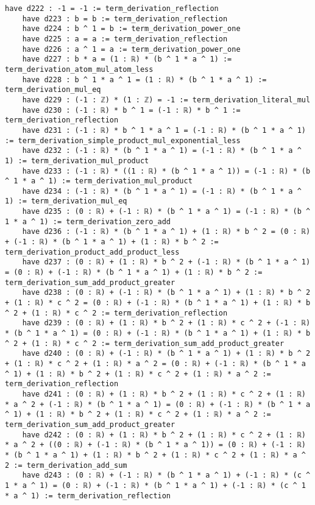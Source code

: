 \documentclass{article}
\begin{document}
\begin{tcolorbox}[colback=white!10, width=\linewidth]
\begin{lstlisting}[language=Lean4]
    have d222 : -1 = -1 := term_derivation_reflection
    have d223 : b = b := term_derivation_reflection
    have d224 : b ^ 1 = b := term_derivation_power_one
    have d225 : a = a := term_derivation_reflection
    have d226 : a ^ 1 = a := term_derivation_power_one
    have d227 : b * a = (1 : ℝ) * (b ^ 1 * a ^ 1) := term_derivation_atom_mul_atom_less
    have d228 : b ^ 1 * a ^ 1 = (1 : ℝ) * (b ^ 1 * a ^ 1) := term_derivation_mul_eq
    have d229 : (-1 : ℤ) * (1 : ℤ) = -1 := term_derivation_literal_mul
    have d230 : (-1 : ℝ) * b ^ 1 = (-1 : ℝ) * b ^ 1 := term_derivation_reflection
    have d231 : (-1 : ℝ) * b ^ 1 * a ^ 1 = (-1 : ℝ) * (b ^ 1 * a ^ 1) := term_derivation_simple_product_mul_exponential_less
    have d232 : (-1 : ℝ) * (b ^ 1 * a ^ 1) = (-1 : ℝ) * (b ^ 1 * a ^ 1) := term_derivation_mul_product
    have d233 : (-1 : ℝ) * ((1 : ℝ) * (b ^ 1 * a ^ 1)) = (-1 : ℝ) * (b ^ 1 * a ^ 1) := term_derivation_mul_product
    have d234 : (-1 : ℝ) * (b ^ 1 * a ^ 1) = (-1 : ℝ) * (b ^ 1 * a ^ 1) := term_derivation_mul_eq
    have d235 : (0 : ℝ) + (-1 : ℝ) * (b ^ 1 * a ^ 1) = (-1 : ℝ) * (b ^ 1 * a ^ 1) := term_derivation_zero_add
    have d236 : (-1 : ℝ) * (b ^ 1 * a ^ 1) + (1 : ℝ) * b ^ 2 = (0 : ℝ) + (-1 : ℝ) * (b ^ 1 * a ^ 1) + (1 : ℝ) * b ^ 2 := term_derivation_product_add_product_less
    have d237 : (0 : ℝ) + (1 : ℝ) * b ^ 2 + (-1 : ℝ) * (b ^ 1 * a ^ 1) = (0 : ℝ) + (-1 : ℝ) * (b ^ 1 * a ^ 1) + (1 : ℝ) * b ^ 2 := term_derivation_sum_add_product_greater
    have d238 : (0 : ℝ) + (-1 : ℝ) * (b ^ 1 * a ^ 1) + (1 : ℝ) * b ^ 2 + (1 : ℝ) * c ^ 2 = (0 : ℝ) + (-1 : ℝ) * (b ^ 1 * a ^ 1) + (1 : ℝ) * b ^ 2 + (1 : ℝ) * c ^ 2 := term_derivation_reflection
    have d239 : (0 : ℝ) + (1 : ℝ) * b ^ 2 + (1 : ℝ) * c ^ 2 + (-1 : ℝ) * (b ^ 1 * a ^ 1) = (0 : ℝ) + (-1 : ℝ) * (b ^ 1 * a ^ 1) + (1 : ℝ) * b ^ 2 + (1 : ℝ) * c ^ 2 := term_derivation_sum_add_product_greater
    have d240 : (0 : ℝ) + (-1 : ℝ) * (b ^ 1 * a ^ 1) + (1 : ℝ) * b ^ 2 + (1 : ℝ) * c ^ 2 + (1 : ℝ) * a ^ 2 = (0 : ℝ) + (-1 : ℝ) * (b ^ 1 * a ^ 1) + (1 : ℝ) * b ^ 2 + (1 : ℝ) * c ^ 2 + (1 : ℝ) * a ^ 2 := term_derivation_reflection
    have d241 : (0 : ℝ) + (1 : ℝ) * b ^ 2 + (1 : ℝ) * c ^ 2 + (1 : ℝ) * a ^ 2 + (-1 : ℝ) * (b ^ 1 * a ^ 1) = (0 : ℝ) + (-1 : ℝ) * (b ^ 1 * a ^ 1) + (1 : ℝ) * b ^ 2 + (1 : ℝ) * c ^ 2 + (1 : ℝ) * a ^ 2 := term_derivation_sum_add_product_greater
    have d242 : (0 : ℝ) + (1 : ℝ) * b ^ 2 + (1 : ℝ) * c ^ 2 + (1 : ℝ) * a ^ 2 + ((0 : ℝ) + (-1 : ℝ) * (b ^ 1 * a ^ 1)) = (0 : ℝ) + (-1 : ℝ) * (b ^ 1 * a ^ 1) + (1 : ℝ) * b ^ 2 + (1 : ℝ) * c ^ 2 + (1 : ℝ) * a ^ 2 := term_derivation_add_sum
    have d243 : (0 : ℝ) + (-1 : ℝ) * (b ^ 1 * a ^ 1) + (-1 : ℝ) * (c ^ 1 * a ^ 1) = (0 : ℝ) + (-1 : ℝ) * (b ^ 1 * a ^ 1) + (-1 : ℝ) * (c ^ 1 * a ^ 1) := term_derivation_reflection

\end{lstlisting}
\end{tcolorbox}
\end{document}
